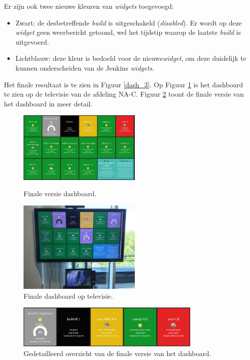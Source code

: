 \documentclass[10pt,a4paper]{article}
\begin{document}
Er zijn ook twee nieuwe kleuren van \textit{widgets} toegevoegd:
\begin{itemize}
\item Zwart: de desbetreffende \textit{build} is uitgeschakeld (\textit{disabled}). Er wordt op deze \textit{widget} geen weerbericht getoond, wel het tijdstip waarop de laatste \textit{build} is uitgevoerd.
\item Lichtblauw: deze kleur is bedoeld voor de nieuws\textit{widget}, om deze duidelijk te kunnen onderscheiden van de Jenkins \textit{widgets}.
\end{itemize}

Het finale resultaat is te zien in Figuur \ref{dash_3}. Op Figuur \ref{dash_4} is het dashboard te zien op de televisie van de afdeling NA-C. Figuur \ref{dash_5} toont de finale versie van het dashboard in meer detail.

\begin{figure}
\centering
\begin{minipage}{0.45\textwidth}
\centering
\includegraphics[width=60mm]{dashboard_screenshot4.png}
\caption{Finale versie dashboard.}
\label{dash_3}
\end{minipage}\hfill
\begin{minipage}{0.45\textwidth}
\centering
\includegraphics[width=60mm]{dashboardresult.jpg}
\caption{Finale dashboard op televisie.}
\label{dash_4}
\end{minipage}
\end{figure}

\begin{figure}[ht!]
\centering
\includegraphics[width=90mm]{dashboard_screenshot5.png}
\caption{Gedetailleerd overzicht van de finale versie van het dashboard.} 
\label{dash_5}
\end{figure}
\end{document}
